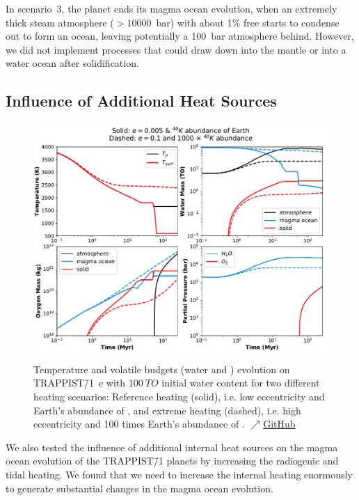 \documentclass[paper=letterpaper,fontsize=12pt,oneside,twocolumn]{article}
\begin{document}
In scenario~3, the planet ends its magma ocean evolution, when an extremely thick steam atmosphere ($>10000$~bar) with about 1\% free  starts to condense out to form an ocean, leaving potentially a 100~bar  atmosphere behind. However, we did not implement processes that could draw down  into the mantle or into a water ocean after solidification.

\subsection{Influence of Additional Heat Sources}

\begin{figure}[h]
    \centering
    \includegraphics[width=\textwidth]{BarthFig7.pdf}
    \caption{Temperature and volatile budgets (water and ) evolution on TRAPPIST\=/1~e with $\SI{100}{TO}$ initial water content for two different heating scenarios: Reference heating (solid), i.e. low eccentricity and Earth's abundance of , and extreme heating (dashed), i.e. high eccentricity and 100 times Earth's abundance of .
    \href{https://github.com/pbfeu/Trappist1_MagmOc/tree/public/Fig_Trappist1e_Compare_Heat}{$\nearrow$GitHub}
    }
    \label{TR1_fluxes_volatiles}%
\end{figure}

We also tested the influence of additional internal heat sources on the magma ocean evolution of the TRAPPIST\=/1 planets by increasing the radiogenic and tidal heating. 
We found that we need to increase the internal heating enormously to generate substantial changes in the magma ocean evolution. 
\end{document}
